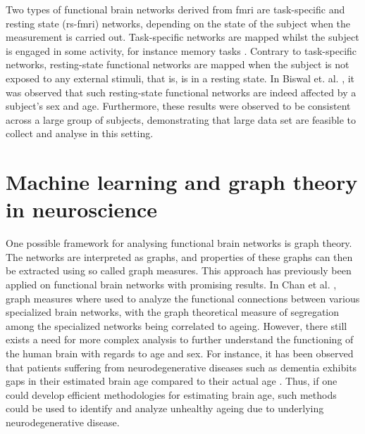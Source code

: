 Two types of functional brain networks derived from \acrshort{fmri} are task-specific and resting state (\acrshort{rs-fmri}) networks, depending on the state of the subject when the measurement is carried out. Task-specific networks are mapped whilst the subject is engaged in some activity, for instance memory tasks \cite{grady}. Contrary to task-specific networks, resting-state functional networks are mapped when the subject is not exposed to any external stimuli, that is, is in a resting state. In Biswal et. al. \cite{biswal}, it was observed that such resting-state functional networks are indeed affected by a subject's sex and age. Furthermore, these results were observed to be consistent across a large group of subjects, demonstrating that large data set are feasible to collect and analyse in this setting.

\section{Machine learning and graph theory in neuroscience}

One possible framework for analysing functional brain networks is graph theory. The networks are interpreted as graphs, and properties of these graphs can then be extracted using so called graph measures. This approach has previously been applied on functional brain networks with promising results. In Chan et al. \cite{chan}, graph measures where used to analyze the functional connections between various specialized brain networks, with the graph theoretical measure of segregation among the specialized networks being correlated to ageing. However, there still exists a need for more complex analysis to further understand the functioning of the human brain with regards to age and sex. For instance, it has been observed that patients suffering from neurodegenerative diseases such as dementia exhibits gaps in their estimated brain age compared to their actual age \cite{kaufmann}. Thus, if one could develop efficient methodologies for estimating brain age, such methods could be used to identify and analyze unhealthy ageing due to underlying neurodegenerative disease. 



